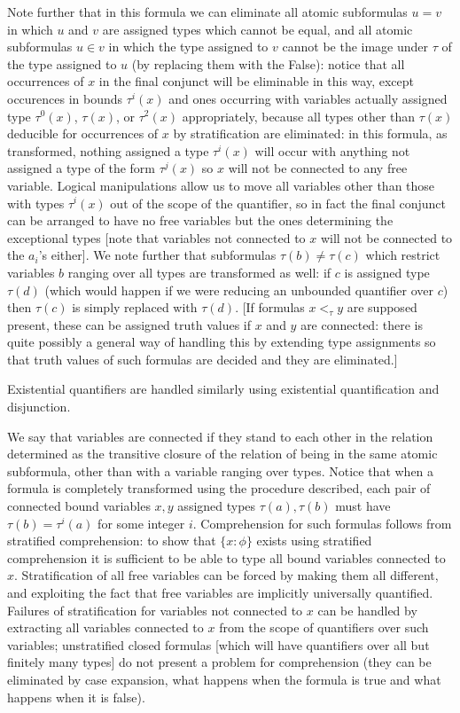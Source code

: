 \documentclass[12pt]{article}
\begin{document}
Note further that in this formula we can eliminate all atomic subformulas $u=v$ in which $u$ and $v$ are assigned types which cannot be equal, and all atomic subformulas $u \in v$ in which the type assigned to $v$ cannot be the image under $\tau$ of the type assigned to $u$ (by replacing them with the False):  notice that all occurrences of $x$ in the final conjunct will be eliminable in this way, except occurences in bounds $\tau^i(x)$ and ones occurring with variables actually assigned type $\tau^0(x)$, $\tau(x)$, or $\tau^2(x)$ appropriately, because all types other than $\tau(x)$ deducible for occurrences of $x$ by stratification are eliminated:  in this formula, as transformed, nothing assigned a type $\tau^i(x)$ will occur with anything not assigned
a type of the form $\tau^j(x)$ so $x$ will not be connected to any free variable.  Logical manipulations allow us to move all variables other than those with types $\tau^i(x)$ out of the scope of the quantifier, so in fact the final conjunct can be arranged to have no free variables but the ones determining the exceptional types [note that variables not connected to $x$ will not be connected to the $a_i$'s either].    We note further that subformulas $\tau(b) \neq \tau(c)$ which restrict variables $b$ ranging over all types are transformed as well:  if $c$ is assigned type $\tau(d)$ (which would happen if we were reducing an unbounded quantifier over $c$) then $\tau(c)$ is simply replaced with $\tau(d)$.  [If formulas $x <_\tau y$ are supposed present, these can be assigned truth values if $x$ and $y$ are connected:  there is quite possibly a general way of handling this by extending type assignments so that truth values of such formulas are decided and they are eliminated.]

Existential quantifiers are handled similarly using existential quantification and disjunction.

We say that variables are connected if they stand to each other in the relation determined as the transitive closure of the relation of being in the same atomic subformula, other than with a variable ranging over types.  Notice that when a formula is completely transformed using the procedure described, each pair of connected bound variables $x,y$ assigned types $\tau(a), \tau(b)$ must have
$\tau(b) = \tau^i(a)$ for some integer $i$.  Comprehension for such formulas follows from stratified comprehension:  to show that $\{x:\phi\}$ exists using stratified comprehension it is sufficient to be able to type all bound variables connected to $x$.  Stratification of all free variables can be forced by making them all different, and exploiting the fact
that free variables are implicitly universally quantified.   Failures of stratification for variables not connected to $x$ can be handled by extracting all variables connected to $x$ from the scope of quantifiers over such variables; unstratified closed formulas [which will have quantifiers over all but finitely many types] do not present a problem for comprehension (they can be eliminated by case expansion, what happens when the formula is true and what happens when it is false).
\end{document}
